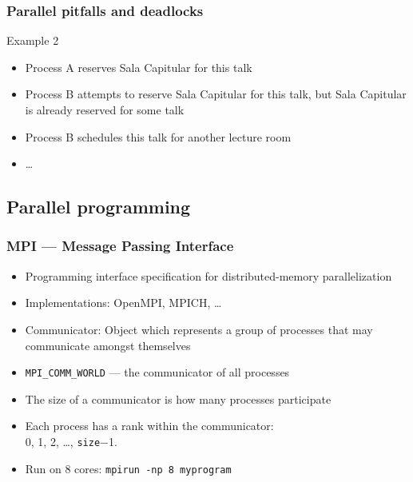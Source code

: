 \documentclass[usenames,dvipsnames,mathserif,compress]{beamer}
\begin{document}
\begin{frame}
  \frametitle{Parallel pitfalls and deadlocks}
  \begin{block}{Example 2}
    \begin{itemize}
    \item Process A reserves Sala Capitular for this talk
    \item Process B attempts to reserve Sala Capitular for this talk,
      but Sala Capitular is already reserved for some talk
    \item Process B schedules this talk for another lecture room
    \item \ldots
  \end{itemize}
  \end{block}
\end{frame}

\subsection*{Parallel programming}

\begin{frame}[fragile]
  \frametitle{MPI --- Message Passing Interface}
  \begin{itemize}
  \item Programming interface specification for distributed-memory parallelization
  \item Implementations: OpenMPI, MPICH, \ldots
  \item \alert{Communicator}: Object which represents a group of processes that may communicate amongst themselves
  \item \verb#MPI_COMM_WORLD# --- the communicator of all processes
  \item The \alert{size} of a communicator is how many processes participate
  \item Each process has a \alert{rank} within the communicator:\\ 0, 1, 2, \ldots, \texttt{size}$-$1.
  \item Run on 8 cores: \texttt{mpirun -np 8 myprogram}
  \end{itemize}
\end{frame}
\end{document}
